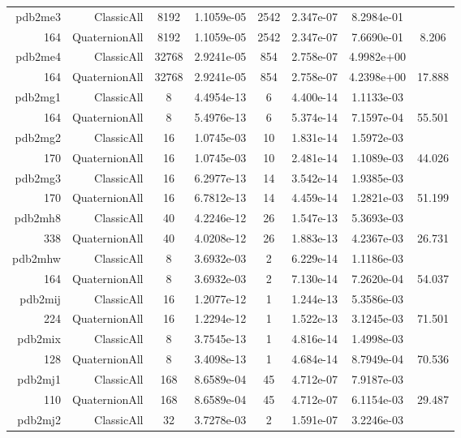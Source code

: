 \begin{xltabular}{\textwidth}{r|rcS[table-format=1.4e+2]cS[table-format=1.3e+2]S[table-format=1.4e+2]S[table-format=-1.3]}
pdb2me3 & ClassicAll & 8192 & 1.1059e-05 & 2542 & 2.347e-07 & 8.2984e-01 & \\
164 & QuaternionAll & 8192 & 1.1059e-05 & 2542 & 2.347e-07 & 7.6690e-01 & 8.206\\  \addlinespace
pdb2me4 & ClassicAll & 32768 & 2.9241e-05 & 854 & 2.758e-07 & 4.9982e+00 & \\
164 & QuaternionAll & 32768 & 2.9241e-05 & 854 & 2.758e-07 & 4.2398e+00 & 17.888\\  \addlinespace
pdb2mg1 & ClassicAll & 8 & 4.4954e-13 & 6 & 4.400e-14 & 1.1133e-03 & \\
164 & QuaternionAll & 8 & 5.4976e-13 & 6 & 5.374e-14 & 7.1597e-04 & 55.501\\  \addlinespace
pdb2mg2 & ClassicAll & 16 & 1.0745e-03 & 10 & 1.831e-14 & 1.5972e-03 & \\
170 & QuaternionAll & 16 & 1.0745e-03 & 10 & 2.481e-14 & 1.1089e-03 & 44.026\\  \addlinespace
pdb2mg3 & ClassicAll & 16 & 6.2977e-13 & 14 & 3.542e-14 & 1.9385e-03 & \\
170 & QuaternionAll & 16 & 6.7812e-13 & 14 & 4.459e-14 & 1.2821e-03 & 51.199\\  \addlinespace
pdb2mh8 & ClassicAll & 40 & 4.2246e-12 & 26 & 1.547e-13 & 5.3693e-03 & \\
338 & QuaternionAll & 40 & 4.0208e-12 & 26 & 1.883e-13 & 4.2367e-03 & 26.731\\  \addlinespace
pdb2mhw & ClassicAll & 8 & 3.6932e-03 & 2 & 6.229e-14 & 1.1186e-03 & \\
164 & QuaternionAll & 8 & 3.6932e-03 & 2 & 7.130e-14 & 7.2620e-04 & 54.037\\  \addlinespace
pdb2mij & ClassicAll & 16 & 1.2077e-12 & 1 & 1.244e-13 & 5.3586e-03 & \\
224 & QuaternionAll & 16 & 1.2294e-12 & 1 & 1.522e-13 & 3.1245e-03 & 71.501\\  \addlinespace
pdb2mix & ClassicAll & 8 & 3.7545e-13 & 1 & 4.816e-14 & 1.4998e-03 & \\
128 & QuaternionAll & 8 & 3.4098e-13 & 1 & 4.684e-14 & 8.7949e-04 & 70.536\\  \addlinespace
pdb2mj1 & ClassicAll & 168 & 8.6589e-04 & 45 & 4.712e-07 & 7.9187e-03 & \\
110 & QuaternionAll & 168 & 8.6589e-04 & 45 & 4.712e-07 & 6.1154e-03 & 29.487\\  \addlinespace
pdb2mj2 & ClassicAll & 32 & 3.7278e-03 & 2 & 1.591e-07 & 3.2246e-03 & \\

\end{xltabular}
